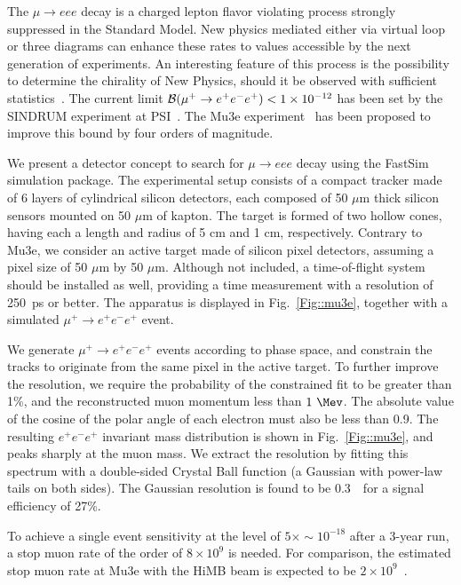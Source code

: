 

The $\mu \rightarrow eee$ decay is a charged lepton flavor violating process strongly suppressed in the Standard Model. New physics mediated either via virtual loop or three diagrams can enhance these rates to values accessible by the next generation of experiments. An interesting feature of this process is 
the possibility to determine the chirality of New Physics, should it be observed with sufficient statistics~\cite{Okada:1999zk}. The current limit ${\cal B}(\mu^+\to e^+e^-e^+) < 1\times 10^{-12}$ has been set by the SINDRUM experiment at PSI~\cite{Bellgardt:1987du}. The Mu3e experiment~\cite{Blondel:2013ia} has been proposed to improve this bound by four orders of magnitude.

We present a detector concept to search for $\mu \rightarrow eee$ decay using the FastSim simulation package. The experimental setup  consists of a compact tracker made of 6 layers of cylindrical silicon detectors, each composed of 50 $\mu$m thick silicon sensors mounted on 50 $\mu$m of kapton. The target is formed of two hollow cones, having each a length and radius of 5 cm and 1 cm, respectively. Contrary to Mu3e, we consider an active target made of silicon pixel detectors, assuming a pixel size of 50 $\mu$m by 50 $\mu$m. Although not included, a time-of-flight system should be installed as well, providing a time measurement with a resolution of 250~ps or better. The apparatus is displayed in Fig.~\ref{Fig::mu3e}, together with a simulated $\mu^+ \rightarrow e^+e^-e^+$ event.

We generate $\mu^+ \rightarrow e^+e^-e^+$ events according to phase space, and constrain the tracks to originate from the same pixel in the active target. To further improve the resolution, we require the probability of the constrained fit to be greater than 1\%, and the reconstructed muon momentum less than $1 ~\Mev$. The absolute value of the cosine of the polar angle of each electron must also be less than 0.9. The resulting $e^+e^-e^+$ invariant mass distribution is shown in Fig.~\ref{Fig::mu3e}, and peaks sharply at the muon mass. We extract the resolution by fitting this spectrum with a double-sided Crystal Ball function (a Gaussian with power-law tails on both sides). The Gaussian resolution is found to be 0.3~\Mev\ for a signal efficiency of 27\%.  

To achieve a single event sensitivity at the level of $5\times\sim 10^{-18}$ after a 3-year run, a stop muon rate of the order of $8\times 10^{9}$ is needed. For comparison, the estimated stop muon rate at Mu3e with the HiMB beam is expected to be $2\times 10^{9}$~\cite{Blondel:2013ia}.


